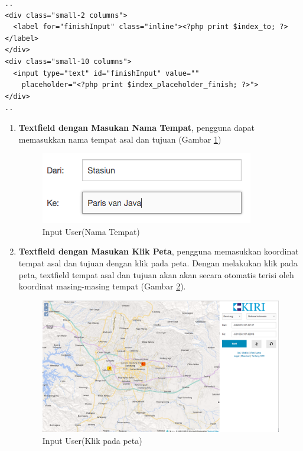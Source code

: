 \documentclass[a4paper,twoside]{article}
\begin{document}
\begin{enumerate}
\begin{lstlisting}[caption=Menampilkan \textit{textfield} tempat tujuan kepada pengguna ,label = {lst_3_php_textfield_to}]
..
<div class="small-2 columns">
  <label for="finishInput" class="inline"><?php print $index_to; ?></label>
</div>
<div class="small-10 columns">
  <input type="text" id="finishInput" value=""
    placeholder="<?php print $index_placeholder_finish; ?>">
</div>
..
\end{lstlisting}

\begin{enumerate}
  \item \textbf{Textfield dengan Masukan Nama Tempat}, pengguna dapat memasukkan nama tempat asal dan tujuan (Gambar \ref{fig:3_KIRI_textfield_nama})
  
  \begin{figure}[H]
    \centering
    \includegraphics[scale=0.5]{Gambar/KIRI-textfield-nama}
    \caption{Input User(Nama Tempat)} 
    \label{fig:3_KIRI_textfield_nama}
  \end{figure}
  
  \item \textbf{Textfield dengan Masukan Klik Peta}, pengguna memasukkan koordinat tempat asal dan tujuan dengan klik pada peta. Dengan melakukan klik pada peta, textfield tempat asal dan tujuan akan akan secara otomatis terisi oleh koordinat masing-masing tempat (Gambar \ref{fig:3_KIRI_textfield_koord}).
  
  \begin{figure}[H]
    \centering
    \includegraphics[scale=0.3]{Gambar/KIRI-textfield-koord}
    \caption{Input User(Klik pada peta)} 
    \label{fig:3_KIRI_textfield_koord}
  \end{figure}
  

\end{enumerate}
\end{enumerate}
\end{document}
